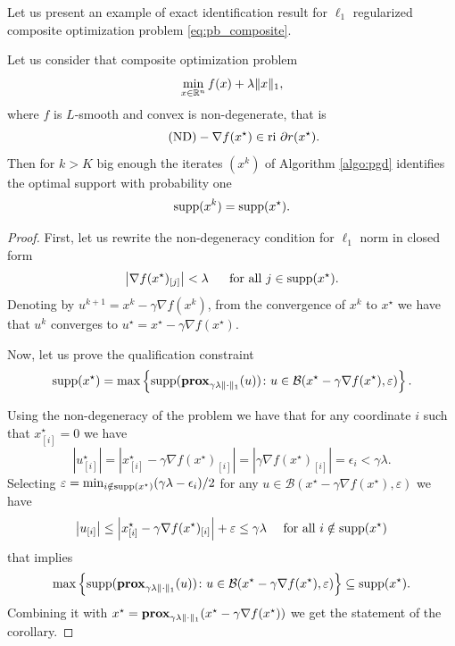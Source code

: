 Let us present an example of exact identification result for $\ell_1$ regularized composite optimization problem \eqref{eq:pb_composite}.
\begin{example}
\label{ex:exact_ident}
Let us consider that composite optimization problem
$$
\min_{x\in\mathbb{R}^n} f(x) + \lambda\|x\|_1,
$$
where $f$ is $L$-smooth and convex is non-degenerate, that is
\begin{equation}\label{eq:non-deg}
\tag{ND}
-\nabla f(x^\star)\in \textnormal{ri } \partial r(x^\star).
\end{equation}
Then for $k>K$ big enough the iterates $(x^k)$ of Algorithm \ref{algo:pgd} identifies the optimal support with probability one
$$
\mathrm{supp}(x^k) = \mathrm{supp}(x^\star).
$$
\begin{proof}
First, let us rewrite the non-degeneracy condition for $\ell_1$ norm in closed form
\begin{equation}\label{eq:nondeg}
\left|\nabla f(x^\star)_{[j]}\right|<\lambda~~~~~\textnormal{for all $j\in\mathrm{supp}(x^\star)$}.
\end{equation}
Denoting by $u^{k+1} = x^k - \gamma\nabla f(x^k)$, from the convergence of $x^k$ to $x^\star$ we have that $u^k$ converges to $u^\star = x^\star - \gamma\nabla f(x^\star)$.

Now, let us prove the qualification constraint 
$$
\mathrm{supp}(x^\star) = \max\left\{ \mathrm{supp}(\mathbf{prox}_{\gamma \lambda\|\cdot\|_1}(u))\colon{u\in\mathcal{B}(x^\star - \gamma\nabla f(x^\star),\varepsilon)}\right\}.
$$

Using the non-degeneracy of the problem we have that for any coordinate $i$ such that $x^\star_{[i]} = 0$ we have
$$
\left|u^{\star}_{[i]}\right| = \left|x^{\star}_{[i]} - \gamma\nabla f(x^\star)_{[i]}\right| = \left|\gamma\nabla f(x^\star)_{[i]}\right| = \epsilon_i < \gamma\lambda.
$$
Selecting $\varepsilon = \min_{i\notin\mathrm{supp}(x^\star)} (\gamma\lambda - \epsilon_i)/2$ for any $u\in\mathcal{B}(x^\star - \gamma\nabla f(x^\star),\varepsilon)$ we have 
$$
\left|u_{[i]}\right| \leq \left|x^{\star}_{[i]} - \gamma\nabla f(x^\star)_{[i]}\right|+ \varepsilon \le \gamma\lambda ~~~~\textnormal{for all $i\notin\mathrm{supp}(x^\star)$}
$$
that implies
$$
\max\left\{ \mathrm{supp}(\mathbf{prox}_{\gamma \lambda\|\cdot\|_1}(u))\colon{u\in\mathcal{B}(x^\star - \gamma\nabla f(x^\star),\varepsilon)}\right\}\subseteq \mathrm{supp}(x^\star).
$$
Combining it with $x^\star = \mathbf{prox}_{\gamma\lambda\|\cdot\|_1}(x^\star - \gamma\nabla f(x^\star))$ we get the statement of the corollary.
\end{proof}
\end{example}

